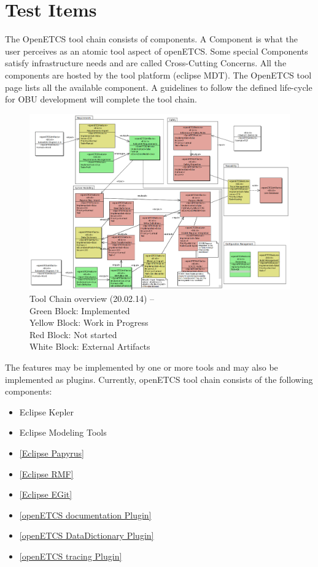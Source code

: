 \section{Test Items}
\label{sec:test_items}
The OpenETCS tool chain consists of components. A Component is what the user perceives as an atomic tool aspect of openETCS. Some special Components satisfy infrastructure needs and are called Cross-Cutting Concerns. All the components are hosted by the tool platform (eclipse MDT). The OpenETCS tool page lists all the available component. A guidelines to follow the defined life-cycle for OBU development will complete the tool chain.

\begin{figure}[htbp]
\includegraphics[width=\textwidth]{ToolChainmodel}
\caption{\label{fig:overview} Tool Chain overview (20.02.14) -- \\
  Green Block: Implemented \\
  Yellow Block: Work in Progress \\
  Red Block: Not started \\
  White Block: External Artifacts} 
\end{figure}
The features may be implemented by one or more tools and may also be implemented as plugins.
Currently, openETCS tool chain consists of the following components:
\begin{itemize}
\item Eclipse Kepler
\item Eclipse Modeling Tools
\item \href{http://www.eclipse.org/papyrus/}{[Eclipse Papyrus]}  
\item \href{http://eclipse.org/rmf/}{[Eclipse RMF]}
\item \href{http://www.eclipse.org/egit/}{[Eclipse EGit]}
\item \href{https://github.com/openETCS/toolchain/wiki/User-Documentation#Generating_Documentation}{[openETCS documentation Plugin]}
\item \href{https://github.com/openETCS/toolchain/wiki/Data-Dictionary-Plugin}{[openETCS DataDictionary Plugin]} 
\item \href{https://github.com/openETCS/toolchain/wiki/User-Documentation#Tracing_Requirements_and_SysML_Models}{[openETCS tracing Plugin]} 
\end{itemize}

